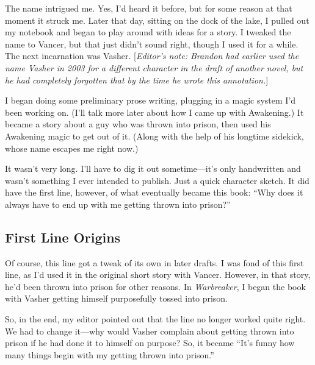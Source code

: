 The name intrigued me. Yes, I’d heard it before, but for some reason at that moment it struck me. Later that day, sitting on the dock of the lake, I pulled out my notebook and began to play around with ideas for a story. I tweaked the name to Vancer, but that just didn’t sound right, though I used it for a while. The next incarnation was Vasher. [\textit{Editor’s note: Brandon had earlier used the name Vasher in 2003 for a different character in the draft of another novel, but he had completely forgotten that by the time he wrote this annotation.}]

I began doing some preliminary prose writing, plugging in a magic system I’d been working on. (I’ll talk more later about how I came up with Awakening.) It became a story about a guy who was thrown into prison, then used his Awakening magic to get out of it. (Along with the help of his longtime sidekick, whose name escapes me right now.)

It wasn’t very long. I’ll have to dig it out sometime—it’s only handwritten and wasn’t something I ever intended to publish. Just a quick character sketch. It did have the first line, however, of what eventually became this book: “Why does it always have to end up with me getting thrown into prison?”

\subsection*{First Line Origins}

Of course, this line got a tweak of its own in later drafts. I was fond of this first line, as I’d used it in the original short story with Vancer. However, in that story, he’d been thrown into prison for other reasons. In \textit{Warbreaker}, I began the book with Vasher getting himself purposefully tossed into prison.

So, in the end, my editor pointed out that the line no longer worked quite right. We had to change it—why would Vasher complain about getting thrown into prison if he had done it to himself on purpose? So, it became “It’s funny how many things begin with my getting thrown into prison.”



